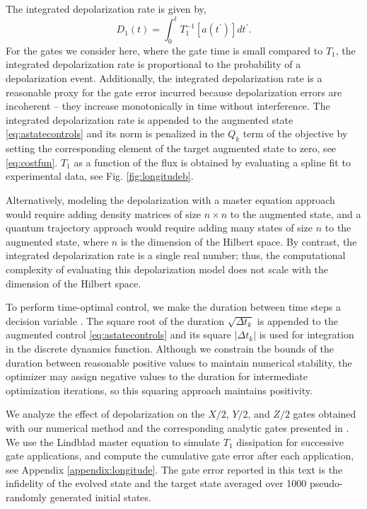 \documentclass[
  amsfonts,
  amsmath,
  amssymb,
  pra,
  twocolumn,
  superscriptaddress,
]{revtex4-2}
\begin{document}
The integrated depolarization rate is given by,
\begin{equation}
  D_{1}(t) = \int_{0}^{t} T_{1}^{-1}[a(t^{\prime})] dt^{\prime}.
\end{equation}
For the gates we consider here, where the gate time is small compared to $T_{1}$,
the integrated depolarization rate is proportional to the probability of a depolarization event.
Additionally, the integrated depolarization rate is a reasonable proxy for the gate error incurred
because depolarization errors are incoherent -- they increase
monotonically in time without interference.
The integrated depolarization rate is appended to the augmented state \eqref{eq:astatecontrols}
and its norm is penalized in the $Q_{k}$ term of the objective by setting
the corresponding element of the target augmented state to zero, see \eqref{eq:costfun}.
$T_{1}$ as a function of the flux is obtained by evaluating
a spline fit to experimental data, see Fig. \ref{fig:longitudeb}.

Alternatively, modeling the depolarization with a master equation approach would require adding
density matrices of size $n \times n$
to the augmented state, and a quantum trajectory approach
would require adding many states of size $n$ to the augmented state,
where $n$ is the dimension of the Hilbert space.
By contrast, the integrated depolarization rate is a single
real number; thus, the computational complexity of evaluating this
depolarization model does not scale
with the dimension of the Hilbert space.

To perform time-optimal control, we make
the duration between time steps
a decision variable \cite{howell2019altro}. 
The square root of the duration $\sqrt{\Delta t_{k}}$
is appended to the augmented control \eqref{eq:astatecontrols}
and its square $\lvert \Delta t_{k} \rvert$ is used
for integration in the discrete dynamics function.
Although we constrain the bounds of the duration between reasonable positive values to maintain
numerical stability, the optimizer may assign negative values to the
duration for intermediate optimization iterations, so this squaring
approach maintains positivity.

We analyze the effect of depolarization on
the $X/2$, $Y/2$, and $Z/2$ gates obtained with
our numerical method and the corresponding analytic gates presented in \cite{zhang2020universal}.
We use the Lindblad master equation to simulate $T_{1}$ dissipation for successive
gate applications, and compute the cumulative gate error
after each application, see Appendix \ref{appendix:longitude}.
The gate error reported in this text is the infidelity
of the evolved state and the target state averaged over 1000 pseudo-randomly
generated initial states.
\end{document}
